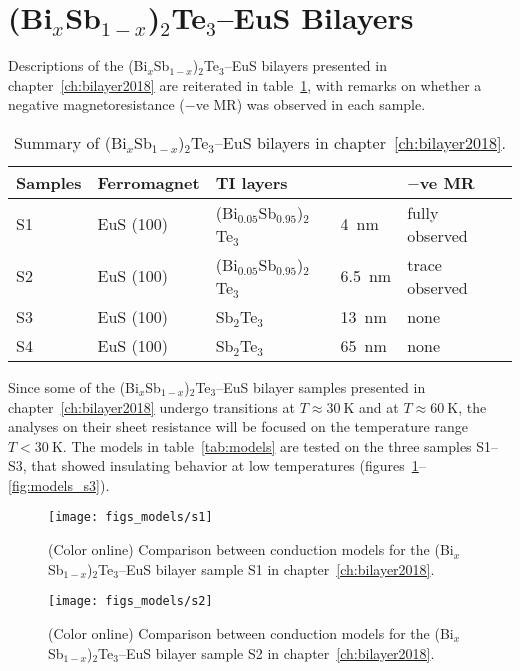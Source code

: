 \section{(Bi$_x$Sb$_{1-x}$)$_2$Te$_3$--EuS Bilayers}
Descriptions of the (Bi$_x$Sb$_{1-x}$)$_2$Te$_3$--EuS bilayers presented in chapter~\ref{ch:bilayer2018} are reiterated in table~\ref{tab:models_bl2018}, with remarks on whether a negative magnetoresistance ($-$ve MR) was observed in each sample.%
%
\begin{table}[ht]
    \centering
    \begin{tabularx}{0.75\columnwidth}[t]{l|l|l|l|X}
    \caption[Summary of (Bi$_x$Sb$_{1-x}$)$_2$Te$_3$--EuS bilayers]{\label{tab:models_bl2018}Summary of (Bi$_x$Sb$_{1-x}$)$_2$Te$_3$--EuS bilayers in chapter~\ref{ch:bilayer2018}.}\\
		\hline\hline
        Samples & Ferromagnet & \multicolumn{2}{|X|}{TI layers} & $-$ve MR\\
        \hline%
        S1 & EuS (100) & (Bi$_{0.05}$Sb$_{0.95}$)$_2$Te$_3$ & 4~nm & fully observed\\
        S2 & EuS (100) & (Bi$_{0.05}$Sb$_{0.95}$)$_2$Te$_3$ & 6.5~nm & trace observed\\
        S3 & EuS (100) & Sb$_2$Te$_3$ & 13~nm & none\\
        S4 & EuS (100) & Sb$_2$Te$_3$ & 65~nm & none\\
		\hline\hline
    \end{tabularx}
\end{table} %
Since some of the (Bi$_x$Sb$_{1-x}$)$_2$Te$_3$--EuS bilayer samples presented in chapter~\ref{ch:bilayer2018} undergo transitions at $T\approx 30~\mathrm{K}$ and at $T \approx 60~\mathrm{K}$, the analyses on their sheet resistance will be focused on the temperature range $T < 30~\mathrm{K}$. The models in table~\ref{tab:models} are tested on the three samples S1--S3, that showed insulating behavior at low temperatures (figures~\ref{fig:models_s1}--\ref{fig:models_s3}).%
%
\begin{figure}[ht]%
    \centering%
    \texttt{[image: figs\_models/s1]}%
    \caption[Conduction model comparison: (Bi$_x$Sb$_{1-x}$)$_2$Te$_3$--EuS bilayer: S1]{\label{fig:models_s1}(Color online) Comparison between conduction models for the (Bi$_x$Sb$_{1-x}$)$_2$Te$_3$--EuS bilayer sample S1 in chapter~\ref{ch:bilayer2018}.}%
\end{figure}%
%
\begin{figure}[ht]%
    \centering%
    \texttt{[image: figs\_models/s2]}%
    \caption[Conduction model comparison: (Bi$_x$Sb$_{1-x}$)$_2$Te$_3$--EuS bilayer: S2]{\label{fig:models_s2}(Color online) Comparison between conduction models for the (Bi$_x$Sb$_{1-x}$)$_2$Te$_3$--EuS bilayer sample S2 in chapter~\ref{ch:bilayer2018}.}%
\end{figure}%
